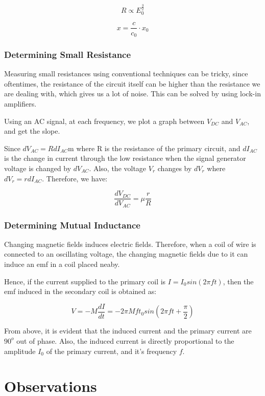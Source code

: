 \documentclass[a4paper]{article}
\begin{document}
$$R\propto E_0^{\frac{3}{2}}$$

$$x=\frac{c}{c_0}\cdot x_0$$


\subsubsection*{Determining Small Resistance}

Measuring small resistances using conventional techniques can be tricky, since oftentimes, the resistance of the circuit itself can be higher than the resistance we are dealing with, which gives us a lot of noise. This can be solved by using lock-in amplifiers. 

Using an AC signal, at each frequency, we plot a graph between $V_{DC}$ and $V_{AC}$, and get the slope.

Since $dV_{AC}=RdI_{AC}$m where R is the resistance of the primary circuit, and $dI_{AC}$ is the change in current through the low resistance when the signal generator voltage is changed by $dV_{AC}$. Also, the voltage $V_r$ changes by $dV_r$ where $dV_r=rdI_{AC}$. Therefore, we have:

$$
\frac{dV_{DC}}{dV_{AC}}=\mu \frac{r}{R}
$$



\subsubsection*{Determining Mutual Inductance}

Changing magnetic fields induces electric fields. Therefore, when a coil of wire is connected to an oscillating voltage, the changing magnetic fields due to it can induce an emf in a coil placed neaby.

Hence, if the current supplied to the primary coil is $ I=I_0sin(2\pi f t)$,
then the emf induced in the secondary coil is obtained as:

$$
V=-M\frac{dI}{dt}= -2\pi Mft_0 sin(2\pi f t+\frac{\pi}{2})
$$

From above, it is evident that the induced current and the primary current are $90^o$ out of phase. Also, the induced current is directly proportional to the amplitude $I_0$ of the primary current, and it's frequency $f$.

\section*{Observations}
\end{document}
